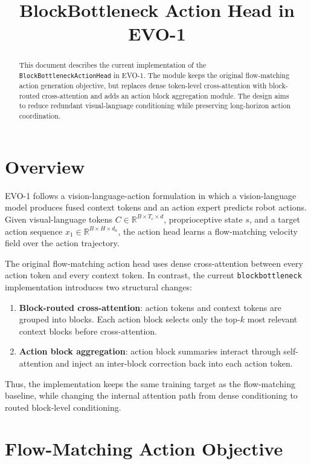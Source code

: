 \documentclass[11pt]{article}
\title{BlockBottleneck Action Head in EVO-1}
\author{}
\date{}
\begin{document}
\maketitle

\begin{abstract}
This document describes the current implementation of the \texttt{BlockBottleneckActionHead} in EVO-1. The module keeps the original flow-matching action generation objective, but replaces dense token-level cross-attention with block-routed cross-attention and adds an action block aggregation module. The design aims to reduce redundant visual-language conditioning while preserving long-horizon action coordination.
\end{abstract}

\section{Overview}

EVO-1 follows a vision-language-action formulation in which a vision-language model produces fused context tokens and an action expert predicts robot actions. Given visual-language tokens $C \in \mathbb{R}^{B \times T_c \times d}$, proprioceptive state $s$, and a target action sequence $x_1 \in \mathbb{R}^{B \times H \times d_a}$, the action head learns a flow-matching velocity field over the action trajectory.

The original flow-matching action head uses dense cross-attention between every action token and every context token. In contrast, the current \texttt{blockbottleneck} implementation introduces two structural changes:
\begin{enumerate}
    \item \textbf{Block-routed cross-attention}: action tokens and context tokens are grouped into blocks. Each action block selects only the top-$k$ most relevant context blocks before cross-attention.
    \item \textbf{Action block aggregation}: action block summaries interact through self-attention and inject an inter-block correction back into each action token.
\end{enumerate}

Thus, the implementation keeps the same training target as the flow-matching baseline, while changing the internal attention path from dense conditioning to routed block-level conditioning.

\section{Flow-Matching Action Objective}
\end{document}
